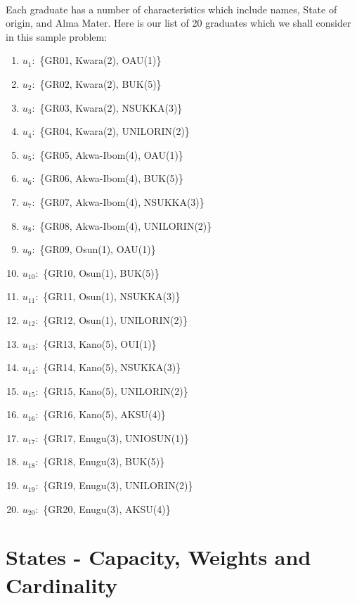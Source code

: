 \documentclass[a4paper]{book}
\begin{document}
			\paragraph{}
				Each graduate has a number of characteristics which include names, State of origin, and Alma Mater. Here is our list of 20 graduates which we shall consider in this sample problem:
				\begin{enumerate}
					\item $u_1\colon$ \{GR01, Kwara(2), OAU(1)\}
					\item $u_2\colon$ \{GR02, Kwara(2), BUK(5)\}
					\item $u_3\colon$ \{GR03, Kwara(2), NSUKKA(3)\}
					\item $u_4\colon$ \{GR04, Kwara(2), UNILORIN(2)\}
					\item $u_5\colon$ \{GR05, Akwa-Ibom(4), OAU(1)\}
					\item $u_6\colon$ \{GR06, Akwa-Ibom(4), BUK(5)\}
					\item $u_7\colon$ \{GR07, Akwa-Ibom(4), NSUKKA(3)\}
					\item $u_8\colon$ \{GR08, Akwa-Ibom(4), UNILORIN(2)\}
					\item $u_9\colon$ \{GR09, Osun(1), OAU(1)\}
					\item $u_{10}\colon$ \{GR10, Osun(1), BUK(5)\}
					\item $u_{11}\colon$ \{GR11, Osun(1), NSUKKA(3)\}
					\item $u_{12}\colon$ \{GR12, Osun(1), UNILORIN(2)\}
					\item $u_{13}\colon$ \{GR13, Kano(5), OUI(1)\}
					\item $u_{14}\colon$ \{GR14, Kano(5), NSUKKA(3)\}
					\item $u_{15}\colon$ \{GR15, Kano(5), UNILORIN(2)\}
					\item $u_{16}\colon$ \{GR16, Kano(5), AKSU(4)\}
					\item $u_{17}\colon$ \{GR17, Enugu(3), UNIOSUN(1)\}
					\item $u_{18}\colon$ \{GR18, Enugu(3), BUK(5)\}
					\item $u_{19}\colon$ \{GR19, Enugu(3), UNILORIN(2)\}
					\item $u_{20}\colon$ \{GR20, Enugu(3), AKSU(4)\}
				\end{enumerate}
		\section{States - Capacity, Weights and Cardinality}
\end{document}
